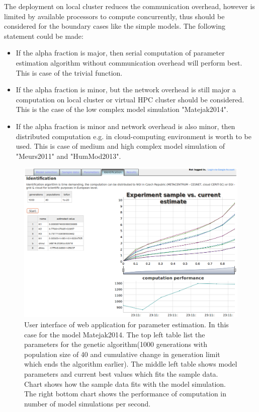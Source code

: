 The deployment on local cluster reduces the communication overhead, however is limited by available processors to compute concurrently, thus should be considered for the boundary cases like the simple models. The following statement could be made:
\begin{itemize}
\item{If the alpha fraction is major, then serial computation of parameter estimation algorithm without communication overhead will perform best. This is case of the trivial function. }
\item{If the alpha fraction is minor, but the network overhead is still major a computation on local cluster or virtual HPC cluster should be considered. This is the case of the low complex model simulation "Matejak2014"\cite{Matejak2014sj}.} 
\item{If the alpha fraction is minor and network overhead is also minor, then distributed computation e.g. in cloud-computing environment is worth to be used. This is case  of medium and high complex model simulation of "Meurs2011"\cite{Meurs2011} and "HumMod2013"\cite{Kofranek2011hummod}.}
\end{itemize}

\begin{figure}[htb]
    \centering
    \includegraphics[width=1\textwidth]{chapter7/app-physiovalues.png}
    \caption{User interface of web application for parameter estimation. In this case for the model Matejak2014\cite{Matejak2014sj}. The top left table list the parameters for the genetic algorithm(1000 generations with population size of 40 and cumulative change in generation limit which ends the algorithm earlier). The middle left table shows model parameters and current best values which fits the sample data. Chart shows how the sample data fits with the model simulation. The right bottom chart shows the performance of computation in number of model simulations per second.}
    \label{fig:app.physiovalues}
\end{figure}

